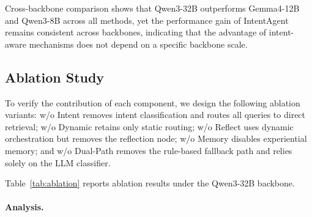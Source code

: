 \documentclass[runningheads]{llncs}
\begin{document}
Cross-backbone comparison shows that Qwen3-32B outperforms Gemma4-12B and Qwen3-8B across all methods, yet the performance gain of IntentAgent remains consistent across backbones, indicating that the advantage of intent-aware mechanisms does not depend on a specific backbone scale.

\subsection{Ablation Study}

To verify the contribution of each component, we design the following ablation variants: w/o Intent removes intent classification and routes all queries to direct retrieval; w/o Dynamic retains only static routing; w/o Reflect uses dynamic orchestration but removes the reflection node; w/o Memory disables experiential memory; and w/o Dual-Path removes the rule-based fallback path and relies solely on the LLM classifier.

Table~\ref{tab:ablation} reports ablation results under the Qwen3-32B backbone.

\begin{table}[htbp]
\centering
\caption{Ablation results (backbone: Qwen3-32B).}
\label{tab:ablation}
\end{table}

\paragraph{Analysis.}
\end{document}
